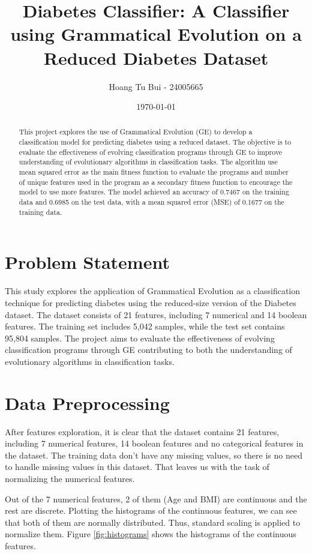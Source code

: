 \documentclass{article}
\title{Diabetes Classifier: A Classifier using Grammatical Evolution on a Reduced Diabetes Dataset}
\author{Hoang Tu Bui - 24005665}
\date{\today}
\begin{document}
\maketitle

\begin{abstract}
    This project explores the use of Grammatical Evolution (GE) to develop a classification model for predicting diabetes using a reduced dataset.
    The objective is to evaluate the effectiveness of evolving classification programs through GE to improve understanding of evolutionary algorithms in classification tasks.
    The algorithm use mean squared error as the main fitness function to evaluate the programs and number of unique features used in the program as a secondary fitness function to encourage the model to use more features.
    The model achieved an accuracy of 0.7467 on the training data and 0.6985 on the test data, with a mean squared error (MSE) of 0.1677 on the training data.

\end{abstract}


\section{Problem Statement}
This study explores the application of Grammatical Evolution as a classification technique for predicting diabetes using the reduced-size version of the Diabetes dataset.
The dataset consists of 21 features, including 7 numerical and 14 boolean features. The training set includes 5,042 samples, while the test set contains 95,804 samples.
The project aims to evaluate the effectiveness of evolving classification programs through GE contributing to both the understanding of evolutionary algorithms in classification tasks.


\section{Data Preprocessing}
After features exploration, it is clear that the dataset contains 21 features, including 7 numerical features, 14 boolean features and no categorical features in the dataset.
The training data don't have any missing values, so there is no need to handle missing values in this dataset.
That leaves us with the task of normalizing the numerical features.

Out of the 7 numerical features, 2 of them (Age and BMI) are continuous and the rest are discrete. 
Plotting the histograms of the continuous features, we can see that both of them are normally distributed.
Thus, standard scaling is applied to normalize them.
Figure \ref{fig:histograms} shows the histograms of the continuous features.
\end{document}
